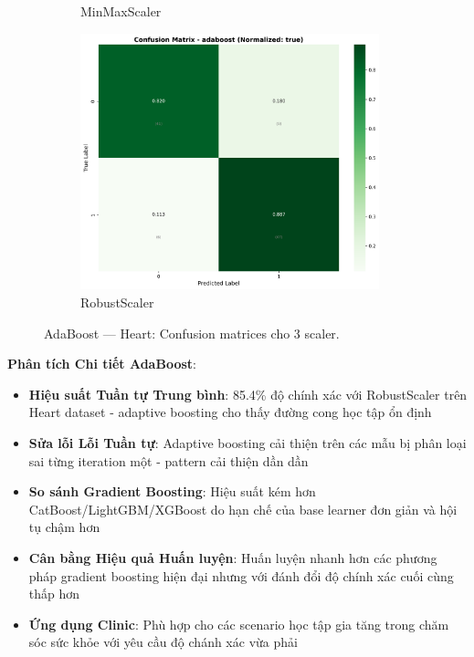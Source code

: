 \begin{figure}[H]
\begin{subfigure}[b]{0.31\textwidth}
\caption{MinMaxScaler}\label{fig:adaboost_heart_cm_minmax}
\end{subfigure}\hfill
\begin{subfigure}[b]{0.31\textwidth}\centering
\includegraphics[width=0.95\textwidth]{Result/heart_dataset/confusion_matrices/adaboost_numeric_dataset_RobustScaler.png}
\caption{RobustScaler}\label{fig:adaboost_heart_cm_robust}
\end{subfigure}
\caption{AdaBoost — Heart: Confusion matrices cho 3 scaler.}
\label{fig:adaboost_heart_confusions}
\end{figure}

\textbf{Phân tích Chi tiết AdaBoost}:
\begin{itemize}
    \item \textbf{Hiệu suất Tuần tự Trung bình}: 85.4\% độ chính xác với RobustScaler trên Heart dataset - adaptive boosting cho thấy đường cong học tập ổn định
    \item \textbf{Sửa lỗi Lỗi Tuần tự}: Adaptive boosting cải thiện trên các mẫu bị phân loại sai từng iteration một - pattern cải thiện dần dần
    \item \textbf{So sánh Gradient Boosting}: Hiệu suất kém hơn CatBoost/LightGBM/XGBoost do hạn chế của base learner đơn giản và hội tụ chậm hơn
    \item \textbf{Cân bằng Hiệu quả Huấn luyện}: Huấn luyện nhanh hơn các phương pháp gradient boosting hiện đại nhưng với đánh đổi độ chính xác cuối cùng thấp hơn
    \item \textbf{Ứng dụng Clinic}: Phù hợp cho các scenario học tập gia tăng trong chăm sóc sức khỏe với yêu cầu độ chánh xác vừa phải
\end{itemize}

